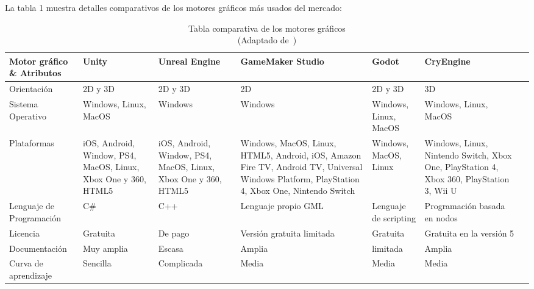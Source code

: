 \vspace{10pt}
La tabla 1 muestra detalles comparativos de los motores gráficos más usados del mercado:
\begin{table}[ht]
    \centering
    \begin{tabularx}{\textwidth}{|X|X|X|X|X|X|X|}
        \hline
        \textbf{Motor gráfico  \& Atributos} & \textbf{Unity} & \textbf{Unreal Engine} & \textbf{GameMaker Studio} & \textbf{Godot} & \textbf{CryEngine}\\\hline
        Orientación                 & 2D y 3D                                                       &2D y 3D                                                          & 2D                            & 2D y 3D               & 3D \\\hline
        Sistema Operativo           & Windows, Linux, MacOS                                           & Windows                                                         & Windows                       & Windows, Linux, MacOS               & Windows, Linux, MacOS\\\hline
        Plataformas                 & iOS, Android, Window, PS4, MacOS,  Linux, Xbox One y 360, HTML5 & iOS, Android, Window, PS4, MacOS,  Linux, Xbox One y 360, HTML5   & Windows, MacOS, Linux, HTML5, Android, iOS, Amazon Fire TV, Android TV, Universal Windows Platform, PlayStation 4, Xbox One, Nintendo Switch    & Windows, MacOS, Linux    & Windows, Linux, Nintendo Switch, Xbox One, PlayStation 4, Xbox 360, PlayStation 3, Wii U\\\hline
        Lenguaje de Programación    & C\#                                                           & C++                                                             & Lenguaje propio GML           & Lenguaje de scripting & Programación basada en nodos \\\hline
        Licencia                    & Gratuita                                                      & De pago                                                         & Versión gratuita limitada     & Gratuita              &  Gratuita en la versión 5\\\hline
        Documentación               & Muy amplia                                                    & Escasa                                                          & Amplia                        & limitada              & Amplia\\\hline
        Curva de aprendizaje        & Sencilla                                                      & Complicada                                                      & Media                         & Media                 & Media \\\hline
        
    \end{tabularx}
    \label{tab: graphics-engines}
    \caption{ Tabla comparativa de los motores gráficos \\ (Adaptado de~\cite{gonjar2019desarrollo})}
\end{table}


